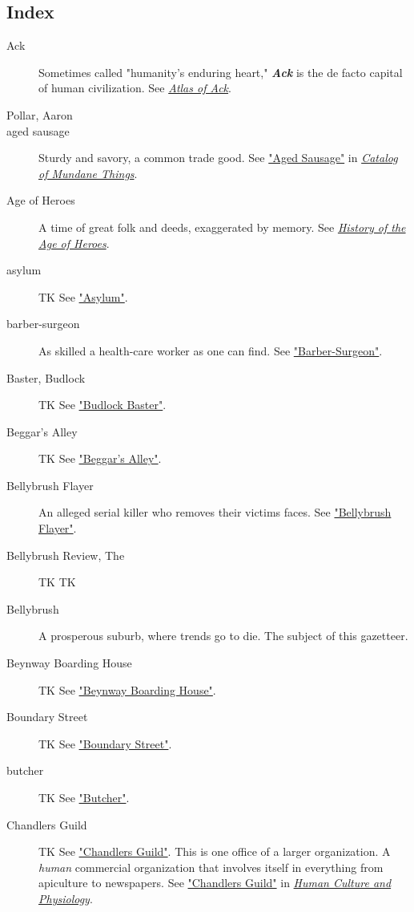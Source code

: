 \documentclass[11pt]{teraum_adventure}
\begin{document}
\subsection*{Index}
\label{sec:org89087c5}
\begin{description}
\item[{Ack}] Sometimes called "humanity's enduring heart," \textbf{\emph{Ack}} is the de facto capital of human civilization. See \href{../reference-books/atlas-of-ack.org}{\emph{Atlas of Ack}}.
\item[{Pollar, Aaron}]

\item[{aged sausage}] Sturdy and savory, a common trade good. See \href{../reference-books/catalog-of-mundane-things.org}{"Aged Sausage"} in \href{../reference-books/catalog-of-mundane-things.org}{\emph{Catalog of Mundane Things}}.
\item[{Age of Heroes}] A time of great folk and deeds, exaggerated by memory. See \href{../reference-books/history-of-the-age-of-heroes.org}{\emph{History of the Age of Heroes}}.
\item[{asylum}] TK See \hyperref[sec:org1386f83]{"Asylum"}.
\item[{barber-surgeon}] As skilled a health-care worker as one can find. See
\hyperref[sec:org9d5b614]{"Barber-Surgeon"}.
\item[{Baster, Budlock}] TK See \hyperref[sec:org5324db1]{"Budlock
Baster"}.
\item[{Beggar's Alley}] TK See \hyperref[sec:orga32863a]{"Beggar's
Alley"}.
\item[{Bellybrush Flayer}] An alleged serial killer who removes their victims faces. See
\hyperref[sec:org1b8a312]{"Bellybrush Flayer"}.
\item[{Bellybrush Review, The}] TK TK
\item[{Bellybrush}] A prosperous suburb, where trends go to die. The subject of this
gazetteer.
\item[{Beynway Boarding House}] TK See
\hyperref[sec:org9461652]{"Beynway Boarding House"}.
\item[{Boundary Street}] TK
See \hyperref[sec:orgd9b4c77]{"Boundary Street"}.
\item[{butcher}] TK See \hyperref[sec:org1b9fcdd]{"Butcher"}.
\item[{Chandlers Guild}] TK
See \hyperref[sec:org0d5a075]{"Chandlers Guild"}. This is one office of a larger
organization. A \emph{human} commercial organization that involves itself in everything from apiculture to newspapers. See \href{../reference-books/human-culture-and-physiology.org}{"Chandlers Guild"} in \href{../reference-books/human-culture-and-physiology.org}{\emph{Human Culture and Physiology}}.

\end{description}
\end{document}

